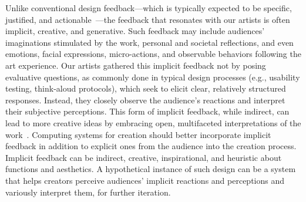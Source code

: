 Unlike conventional design feedback---which is typically expected to be specific, justified, and actionable~\cite{yen2024give, krishna2021ready}---the feedback that resonates with our artists is often implicit, creative, and generative. Such feedback may include audiences' imaginations stimulated by the work, personal and societal reflections, and even emotions, facial expressions, micro-actions, and observable behaviors following the art experience. Our artists gathered this implicit feedback not by posing evaluative questions, as commonly done in typical design processes (e.g., usability testing, think-aloud protocols), which seek to elicit clear, relatively structured responses. Instead, they closely observe the audience's reactions and interpret their subjective perceptions. This form of implicit feedback, while indirect, can lead to more creative ideas by embracing open, multifaceted interpretations of the work~\cite{sengers2006staying}. Computing systems for creation should better incorporate implicit feedback in addition to explicit ones from the audience into the creation process. Implicit feedback can be indirect, creative, inspirational, and heuristic about functions and aesthetics. A hypothetical instance of such design can be a system that helps creators perceive audiences' implicit reactions and perceptions and variously interpret them, for further iteration.

